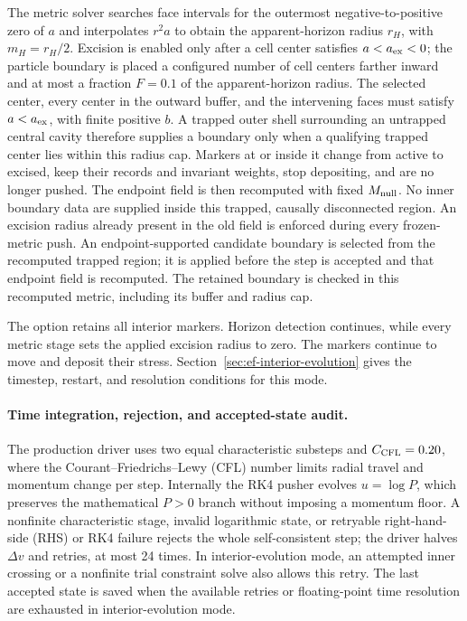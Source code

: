 The metric solver searches face intervals for the outermost
negative-to-positive zero of \(a\) and interpolates \(r^2a\) to obtain the
apparent-horizon radius \(r_H\), with \(m_H=r_H/2\).  Excision is enabled only
after a cell center satisfies \(a<a_{\rm ex}<0\); the particle boundary is
placed a configured number of cell centers farther inward and at most a fraction
\(F=0.1\) of the apparent-horizon radius.  The selected center, every center in the outward buffer, and the intervening
faces must satisfy \(a<a_{\rm ex}\), with finite positive \(b\).  A trapped outer
shell surrounding an untrapped central cavity therefore supplies a boundary
only when a qualifying trapped center lies within this radius cap.  Markers at or
inside it change from active to excised, keep their records and invariant
weights, stop depositing, and are no longer pushed.  The endpoint field is
then recomputed with fixed \(M_{\rm null}\).  No inner boundary data are
supplied inside this trapped, causally disconnected region.
An excision radius already present in the old field is enforced during every
frozen-metric push.  An endpoint-supported candidate boundary
is selected from the recomputed trapped region; it is applied before the step is
accepted and that endpoint field is recomputed. The retained boundary is
checked in this recomputed metric, including its buffer and radius cap.

The option  retains all interior markers. Horizon
detection continues, while every metric stage sets the applied excision
radius to zero. The markers continue to move and deposit their stress.
Section~\ref{sec:ef-interior-evolution} gives the timestep, restart, and resolution
conditions for this mode.

\paragraph{Time integration, rejection, and accepted-state audit.}
The production driver uses two equal characteristic substeps and
\(C_{\rm CFL}=0.20\), where the Courant--Friedrichs--Lewy (CFL) number limits
radial travel and momentum change per step.  Internally the RK4 pusher evolves
\(u=\log P\), which preserves the mathematical \(P>0\) branch without imposing
a momentum floor.  A nonfinite characteristic stage, invalid logarithmic
state, or retryable right-hand-side (RHS) or RK4 failure rejects the whole
self-consistent step;
the driver halves \(\Delta v\) and retries, at most 24 times. In interior-evolution
mode, an attempted inner crossing or a nonfinite trial constraint solve also
allows this retry. The last accepted state is saved when the available
retries or floating-point time resolution are exhausted in interior-evolution mode.

